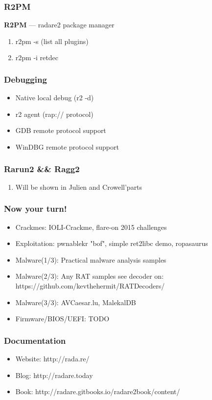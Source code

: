 \documentclass[10pt,pdf,utf8,english,compress,hyperref={unicode}]{beamer}
\begin{document}
\begin{frame}[fragile]
  \frametitle{R2PM}
	\center\textbf{R2PM} — radare2 package manager
  \noindent\makebox[\linewidth]{\rule{\paperwidth}{0.4pt}}
  \begin{enumerate}
  \item r2pm -s (list all plugins)
	\item r2pm -i retdec
 \end{enumerate}
\end{frame}
\begin{frame}[fragile]
  \frametitle{Debugging}
  \begin{itemize}
	\item Native local debug (r2 -d)
	\item r2 agent (rap:// protocol)
	\item GDB remote protocol support
	\item WinDBG remote protocol support
  \end{itemize}
\end{frame}

\begin{frame}[fragile]
  \frametitle{Rarun2 \&\& Ragg2}
  \noindent\makebox[\linewidth]{\rule{\paperwidth}{0.4pt}}
  \begin{enumerate}
  \item Will be shown in Julien and Crowell'parts
 \end{enumerate}
\end{frame}

\begin{frame}[fragile]
  \frametitle{Now your turn!}
    \begin{itemize}
    \item \alert{Crackmes:} IOLI-Crackme, flare-on 2015 challenges
    \item \alert{Exploitation:} pwnablekr "bof", simple ret2libc demo, ropasaurus
    \item \alert{Malware(1/3):} Practical malware analysis samples
    \item \alert{Malware(2/3):} Any RAT samples see decoder on: https://github.com/kevthehermit/RATDecoders/
    \item \alert{Malware(3/3):} AVCaesar.lu, MalekalDB
    \item \alert{Firmware/BIOS/UEFI:} TODO
    \end{itemize}
\end{frame}

\begin{frame}[fragile]
  \frametitle{Documentation}
    \begin{itemize}
    \item \alert{Website:} http://rada.re/
    \item \alert{Blog:} http://radare.today
    \item \alert{Book:} http://radare.gitbooks.io/radare2book/content/
    \end{itemize}
\end{frame}
\end{document}
